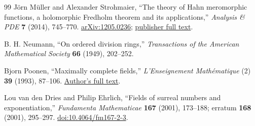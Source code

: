 \documentclass[11pt,letterpaper]{article}
\theoremstyle{definition}
\theoremstyle{remark}
\numberwithin{equation}{section}
\begin{document}
\begin{thebibliography}{99}
J\"orn M\"uller and Alexander Strohmaier,
``The theory of Hahn meromorphic functions, a holomorphic Fredholm theorem and its applications,''
\emph{Analysis \& PDE} \textbf{7} (2014), 745--770.
\href{https://arxiv.org/abs/1205.0236}{arXiv:1205.0236};
\href{https://msp.org/apde/2014/7-3/apde-v7-n3-p08-s.pdf}{publisher full text}.

B. H. Neumann,
``On ordered division rings,''
\emph{Transactions of the American Mathematical Society} \textbf{66} (1949), 202--252.

Bjorn Poonen,
``Maximally complete fields,''
\emph{L'Enseignement Math\'ematique} (2) \textbf{39} (1993), 87--106.
\href{https://math.mit.edu/~poonen/papers/amsval.pdf}{Author's full text}.

Lou van den Dries and Philip Ehrlich,
``Fields of surreal numbers and exponentiation,''
\emph{Fundamenta Mathematicae} \textbf{167} (2001), 173--188;
erratum \textbf{168} (2001), 295--297.
\href{https://doi.org/10.4064/fm167-2-3}{doi:10.4064/fm167-2-3}.
\end{thebibliography}
\end{document}
